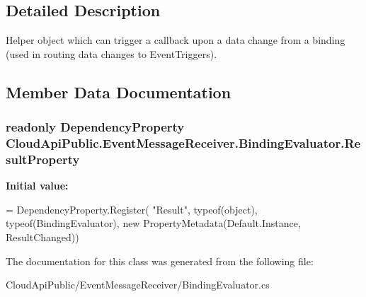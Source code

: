 \subsection{Detailed Description}
Helper object which can trigger a callback upon a data change from a binding (used in routing data changes to Event\-Triggers). 



\subsection{Member Data Documentation}
\hypertarget{class_cloud_api_public_1_1_event_message_receiver_1_1_binding_evaluator_ae1fff27340b14df912170510f645b4e0}{
\subsubsection[{Result\-Property}]{\setlength{\rightskip}{0pt plus 5cm}readonly Dependency\-Property Cloud\-Api\-Public.\-Event\-Message\-Receiver.\-Binding\-Evaluator.\-Result\-Property\hspace{0.3cm}{\ttfamily [static]}}}\label{class_cloud_api_public_1_1_event_message_receiver_1_1_binding_evaluator_ae1fff27340b14df912170510f645b4e0}
{\bfseries Initial value\-:}
\begin{DoxyCode}
= DependencyProperty.Register(
            \textcolor{stringliteral}{"Result"}, typeof(\textcolor{keywordtype}{object}), typeof(BindingEvaluator), \textcolor{keyword}{new} 
      PropertyMetadata(Default.Instance, ResultChanged))
\end{DoxyCode}


The documentation for this class was generated from the following file\-:\begin{DoxyCompactItemize}
\item 
Cloud\-Api\-Public/\-Event\-Message\-Receiver/Binding\-Evaluator.\-cs\end{DoxyCompactItemize}

